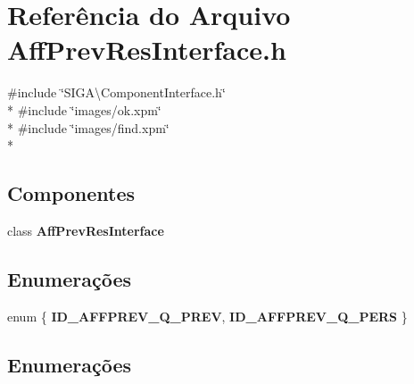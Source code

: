 \section{Referência do Arquivo Aff\+Prev\+Res\+Interface.\+h}
\label{_aff_prev_res_interface_8h}
{\ttfamily \#include \char`\"{}S\+I\+G\+A\textbackslash{}\+Component\+Interface.\+h\char`\"{}}\\*
{\ttfamily \#include \char`\"{}images/ok.\+xpm\char`\"{}}\\*
{\ttfamily \#include \char`\"{}images/find.\+xpm\char`\"{}}\\*
\subsection*{Componentes}
\begin{DoxyCompactItemize}
\item 
class {\bf Aff\+Prev\+Res\+Interface}
\end{DoxyCompactItemize}
\subsection*{Enumerações}
\begin{DoxyCompactItemize}
\item 
enum \{ {\bf I\+D\+\_\+\+A\+F\+F\+P\+R\+E\+V\+\_\+\+Q\+\_\+\+P\+R\+EV}, 
{\bf I\+D\+\_\+\+A\+F\+F\+P\+R\+E\+V\+\_\+\+Q\+\_\+\+P\+E\+RS}
 \}
\end{DoxyCompactItemize}


\subsection{Enumerações}
